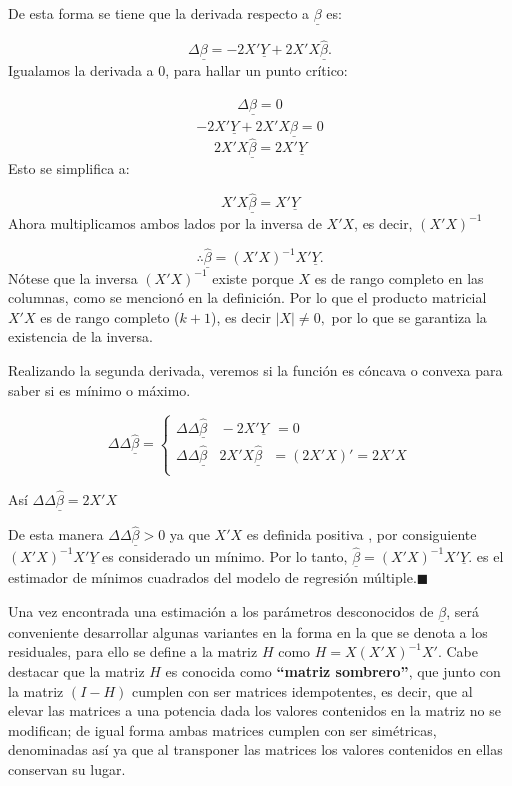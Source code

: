 \documentclass[a4paper,oneside,openany]{book}
\begin{document}
De esta forma se tiene que la derivada respecto a \(\underline{\beta}\)
es:

\[\Delta \underline{\beta}=-2X'\underline{Y}+2X'X\underline{\hat{\beta}}.\]
Igualamos la derivada a 0, para hallar un punto crítico:

\[\Delta \underline{\hat{\beta}}=0\]
\[-2X'\underline{Y}+2X'X\underline{\hat{\beta}}=0\]
\[2X'X\underline{\hat{\beta}}=2X'\underline{Y}\] Esto se simplifica a:

\[X'X\underline{\hat{\beta}}=X'\underline{Y}\] Ahora multiplicamos ambos
lados por la inversa de \(X'X\), es decir, \((X'X)^{-1}\)

\[\therefore \underline{\hat{\beta}}=\left(X'X\right)^{-1}X'\underline{Y}.\]
Nótese que la inversa \(\left(X'X\right)^{-1}\) existe porque \(X\) es
de rango completo en las columnas, como se mencionó en la definición.
Por lo que el producto matricial \(X'X\) es de rango completo (\(k+1\)),
es decir \(|X|\neq 0,\) por lo que se garantiza la existencia de la
inversa.

Realizando la segunda derivada, veremos si la función es cóncava o
convexa para saber si es mínimo o máximo.

\[\Delta \Delta \underline{\hat{\beta}}=\left\{
\begin{array}{ll}
\Delta \Delta \underline{\hat{\beta}} \ \ \ \ -2X' \underline{Y} \ \ =0 \\
\Delta \Delta \underline{\hat{\beta}} \ \ \ \ 2X'X \underline{\hat{\beta}}  \ \ \ = \left(2X'X\right)' =2X'X \\
\end{array}
\right.\]

Así \(\Delta \Delta \underline{\hat{\beta}}=2X'X\)

De esta manera \(\Delta \Delta \underline{\hat{\beta}}>0\) ya que
\(X'X\) es definida positiva , por consiguiente
\((X'X)^{-1}X'\underline{Y}\) es considerado un mínimo. Por lo tanto,
\(\underline{\hat{\beta}}=\left(X'X\right)^{-1}X'\underline{Y}.\) es el
estimador de mínimos cuadrados del modelo de regresión
múltiple.\(\blacksquare\)

Una vez encontrada una estimación a los parámetros desconocidos de
\(\underline{\beta}\), será conveniente desarrollar algunas variantes en
la forma en la que se denota a los residuales, para ello se define a la
matriz \(H\) como \(H=X(X'X)^{-1}X'.\) Cabe destacar que la matriz \(H\)
es conocida como \textbf{``matriz sombrero''}, que junto con la matriz
\((I-H)\) cumplen con ser matrices idempotentes, es decir, que al elevar
las matrices a una potencia dada los valores contenidos en la matriz no
se modifican; de igual forma ambas matrices cumplen con ser simétricas,
denominadas así ya que al transponer las matrices los valores contenidos
en ellas conservan su lugar.
\end{document}
